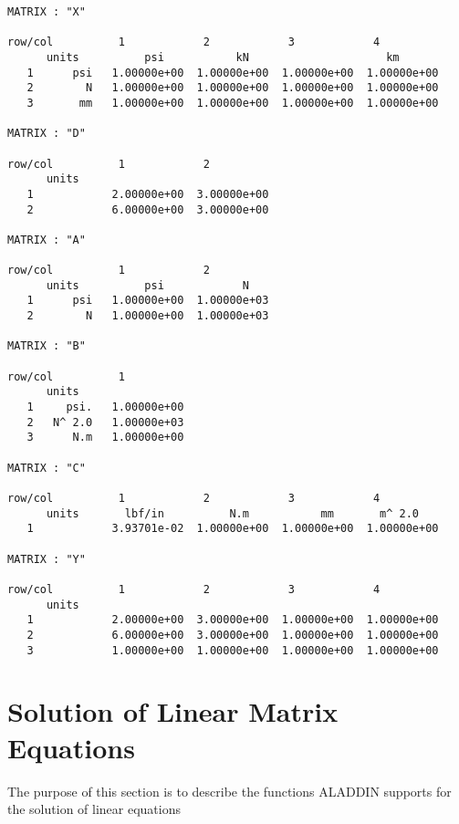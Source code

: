 \begin{footnotesize}
\begin{verbatim}
MATRIX : "X"

row/col          1            2            3            4          
      units          psi           kN                     km   
   1      psi   1.00000e+00  1.00000e+00  1.00000e+00  1.00000e+00
   2        N   1.00000e+00  1.00000e+00  1.00000e+00  1.00000e+00
   3       mm   1.00000e+00  1.00000e+00  1.00000e+00  1.00000e+00

MATRIX : "D"

row/col          1            2          
      units                       
   1            2.00000e+00  3.00000e+00
   2            6.00000e+00  3.00000e+00

MATRIX : "A"

row/col          1            2          
      units          psi            N   
   1      psi   1.00000e+00  1.00000e+03
   2        N   1.00000e+00  1.00000e+03

MATRIX : "B"

row/col          1          
      units             
   1     psi.   1.00000e+00
   2   N^ 2.0   1.00000e+03
   3      N.m   1.00000e+00

MATRIX : "C"

row/col          1            2            3            4          
      units       lbf/in          N.m           mm       m^ 2.0   
   1            3.93701e-02  1.00000e+00  1.00000e+00  1.00000e+00

MATRIX : "Y"

row/col          1            2            3            4          
      units                                           
   1            2.00000e+00  3.00000e+00  1.00000e+00  1.00000e+00
   2            6.00000e+00  3.00000e+00  1.00000e+00  1.00000e+00
   3            1.00000e+00  1.00000e+00  1.00000e+00  1.00000e+00
\end{verbatim}
\end{footnotesize}

\clearpage
\section{Solution of Linear Matrix Equations}

\vspace{0.15 in}
\noindent\hspace{0.50 in}
The purpose of this section is to describe
the functions ALADDIN supports for the solution of linear equations

